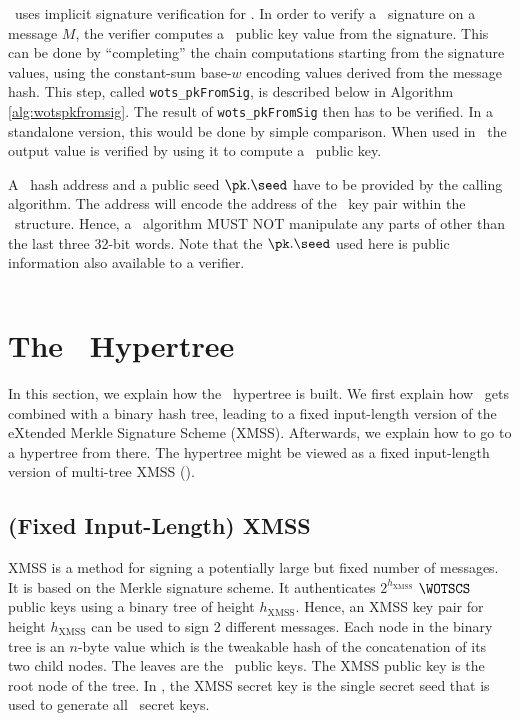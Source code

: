 \SPHINCSA\ uses implicit signature verification for \WOTSCS. In order to verify a \WOTSCS\ signature \sig on a message $M$, the verifier computes a \WOTSCS\ public key value from the signature. This can be done by ``completing'' the chain computations starting from the signature values, using the constant-sum base-$w$ encoding values derived from the message hash. This step, called \texttt{wots\_pkFromSig}, is described below in Algorithm \ref{alg:wotspkfromsig}. The result of \texttt{wots\_pkFromSig} then has to be verified. In a standalone version, this would be done by simple comparison. When used in \SPHINCSA\ the output value is verified by using it to compute a \SPHINCSA\ public key.

A \WOTSCS\ hash address \ADRS and a public seed $\pk.\seed$ have to be provided by the calling algorithm. The address will encode the address of the \WOTSCS\ key pair within the \SPHINCSA\ structure. Hence, a \WOTSCS\ algorithm MUST NOT manipulate any parts of \ADRS other than the last three 32-bit words. Note that the $\pk.\seed$ used here is public information also available to a verifier.

\begin{algorithm}
\inputminted[breaklines,linenos,tabsize=2,mathescape,escapeinside=||]{C}{paper/code/wots_pkFromSig.cs}
\caption{\texttt{wots\_pkFromSig} --- Computing a \WOTSCS\ public key from a message and its signature.}
\label{alg:wotspkfromsig}
\end{algorithm}


\section{The \SPHINCSA\ Hypertree}
\label{sec:hypertree}

In this section, we explain how the \SPHINCSA\ hypertree is built. We first explain how \WOTSCS\ gets combined with a binary hash tree, leading to a fixed input-length version of the eXtended Merkle Signature Scheme (XMSS). Afterwards, we explain how to go to a hypertree from there. The hypertree might be viewed as a fixed input-length version of multi-tree XMSS (\XMSSMT).


\subsection{(Fixed Input-Length) XMSS} \label{sec:xmss}

XMSS is a method for signing a potentially large but fixed number of messages. It is based on the Merkle signature scheme. It authenticates $2^{h_{\mathrm{XMSS}}}$ $\WOTSCS$ public keys using a binary tree of height $h_{\mathrm{XMSS}}$. Hence, an XMSS key pair for height $h_{\mathrm{XMSS}}$ can be used to sign 2 different messages. Each node in the binary tree is an $n$-byte value which is the tweakable hash of the concatenation of its two child nodes. The leaves are the \WOTSCS\ public keys. The XMSS public key is the root node of the tree. In \SPHINCSA, the XMSS secret key is the single secret seed that is used to generate all \WOTSCS\ secret keys.

